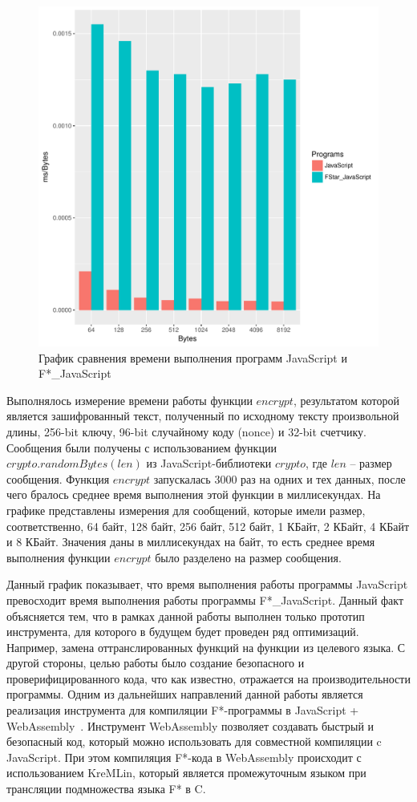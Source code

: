 \begin{figure}[h!]
\begin{center}
\includegraphics[width=.9\textwidth]{Polubelova/Comparison}
\caption{График сравнения времени выполнения программ JavaScript и F*\_JavaScript}
\label{fig:comparison} 
\end{center}
\end{figure}

Выполнялось измерение времени работы функции $encrypt$, результатом которой является зашифрованный текст, полученный по исходному тексту произвольной длины, 256-bit ключу, 96-bit случайному коду (nonce) и 32-bit счетчику. Сообщения были получены с использованием функции $crypto.randomBytes(len)$ из JavaScript-библиотеки $crypto$, где $len$ -- размер сообщения. Функция $encrypt$ запускалась 3000 раз на одних и тех данных, после чего бралось среднее время выполнения этой функции в миллисекундах. На графике представлены измерения для сообщений, которые имели размер, соответственно, 64 байт, 128 байт, 256 байт, 512 байт, 1 КБайт, 2 КБайт, 4 КБайт и 8 КБайт. Значения даны в миллисекундах на байт, то есть среднее время выполнения функции $encrypt$ было разделено на размер сообщения.

Данный график показывает, что время выполнения работы программы JavaScript превосходит время выполнения работы программы F*\_JavaScript. Данный факт объясняется тем, что в рамках данной работы выполнен только прототип инструмента, для которого в будущем будет проведен ряд оптимизаций. Например, замена оттранслированных функций на функции из целевого языка. С другой стороны, целью работы было создание безопасного и проверифицированного кода, что как известно, отражается на производительности программы. Одним из дальнейших направлений данной работы является реализация инструмента для компиляции F*-программы в JavaScript + WebAssembly~\cite{wasm}. Инструмент WebAssembly позволяет создавать быстрый и безопасный код, который можно использовать для совместной компиляции c JavaScript. При этом компиляция F*-кода в WebAssembly происходит с использованием KreMLin, который является промежуточным языком при трансляции подмножества языка F* в C. 


